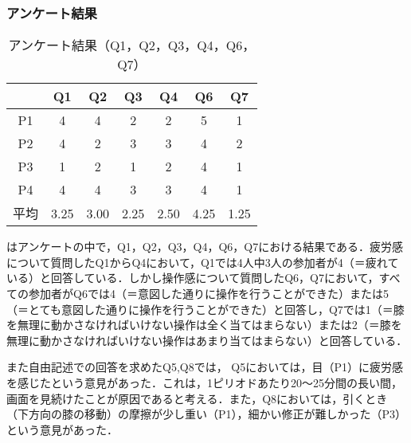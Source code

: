 \documentclass[submit, techrep]{ipsj}
\begin{document}
\subsubsection{アンケート結果}
\begin{table}[tb]
	\begin{center}
		\caption{アンケート結果（Q1，Q2，Q3，Q4，Q6，Q7）}
		\begin{tabular}{|c|c|c|c|c|c|c|}
		\hline
 & Q1 & Q2 & Q3 & Q4 & Q6 & Q7 \\ \hline
P1 & 4 & 4 & 2 & 2 & 5 & 1 \\ \hline
P2 & 4 & 2 & 3 & 3 & 4 & 2 \\ \hline
P3 & 1 & 2 & 1 & 2 & 4 & 1 \\ \hline
P4 & 4 & 4 & 3 & 3 & 4 & 1 \\ \hline
平均 & 3.25 & 3.00 & 2.25 & 2.50 & 4.25 & 1.25 \\ \hline
		\end{tabular}
		\label{tb:enquette}
	\end{center}
\end{table}
はアンケートの中で，Q1，Q2，Q3，Q4，Q6，Q7における結果である．疲労感について質問したQ1からQ4において，Q1では4人中3人の参加者が4（＝疲れている）と回答している．しかし操作感について質問したQ6，Q7において，すべての参加者がQ6では4（＝意図した通りに操作を行うことができた）または5（＝とても意図した通りに操作を行うことができた）と回答し，Q7では1（＝膝を無理に動かさなければいけない操作は全く当てはまらない）または2（＝膝を無理に動かさなければいけない操作はあまり当てはまらない）と回答している．\par
また自由記述での回答を求めたQ5,Q8では，
Q5においては，目（P1）に疲労感を感じたという意見があった．これは，1ピリオドあたり20〜25分間の長い間，画面を見続けたことが原因であると考える．また，Q8においては，引くとき（下方向の膝の移動）の摩擦が少し重い（P1），細かい修正が難しかった（P3）という意見があった．
\end{document}
